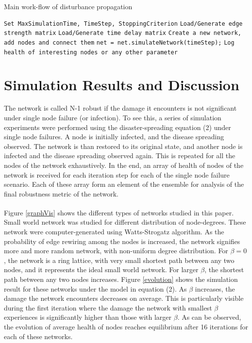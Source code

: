 \documentclass[11pt]{article}
\begin{document}
\begin{algorithm}
\caption{Main work-flow of disturbance propagation}\label{MAIN_PSEUDO_CODE}
\begin{algorithmic}[1]
			\State \texttt{Set MaxSimulationTime, TimeStep, StoppingCriterion}
			\State \texttt{Load/Generate edge strength matrix}
			\State \texttt{Load/Generate time delay matrix}
			\State \texttt{Create a new network, add nodes and connect them}
	\EndProcedure
			\State \texttt{net = net.simulateNetwork(timeStep);}
			\State \texttt{Log health of interesting nodes or any other parameter}
		\EndWhile
	\EndProcedure
\EndProcedure
\end{algorithmic}
\end{algorithm}

\newpage
\section{Simulation Results and Discussion}
The network is called N-1 robust if the damage it encounters is not significant under single node failure (or infection).  To see this, a series of simulation experiments were performed using the disaster-spreading equation (2) under single node failures. A node is initially infected, and the disease spreading observed. The network is than restored to its original state, and another node is infected and the disease spreading observed again. This is repeated for all the nodes of the network exhaustively. In the end, an array of health of nodes of the network is received for each iteration step for each of the single node failure scenario. Each of these array form an element of the ensemble for analysis of the final robustness metric of the network. \\
\\
Figure \ref{graphVis} shows the different types of networks studied in this paper. Small world network was studied for different distribution of node-degrees. These network were computer-generated using Watts-Strogatz algorithm. As the probability of edge rewiring among the nodes is increased, the network signifies more and more random network, with non-uniform degree distribution. For $\beta=0$, the network is a ring lattice, with very small shortest path between any two nodes, and it represents the ideal small world network. For larger $\beta$, the shortest path between any two nodes increases. Figure \ref{evolution} shows the simulation result for these networks under the model in equation (2). As $\beta$ increases, the damage the network encounters decreases on average. This is particularly visible during the first iteration where the damage the network with smallest $\beta$ experiences is significantly higher than those with larger $\beta$. As can be observed, the evolution of average health of nodes reaches equilibrium after 16 iterations for each of these networks. 
\end{document}
